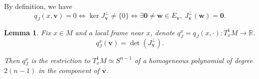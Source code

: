\documentclass[reqno,11pt]{article}
\newtheorem{lemma}{Lemma}[section]
\theoremstyle{definition}
\theoremstyle{remark}
\numberwithin{equation}{section}
\begin{document}
By definition, we have
\begin{displaymath}
	q_{J}(x,\bm{v})=0 \Leftrightarrow\ker J^{\perp}_{\bm{v}}\neq \{0\}\Leftrightarrow \exists \bm{0}\neq\bm{w}\in E_{\bm{v}},~J^{\perp}_{\bm{v}}(\bm{w})=\bm{0}.
\end{displaymath}

\begin{lemma}\label{lem_5_1}
	Fix $x\in M$ and a local frame near $x$, denote $q_{J}^{x}=q_J(x,\cdot):T^{1}_{x}M\to \mathbb{R}$.
	\begin{displaymath}
		q_{J}^{x}(\bm{v})=\det(J_{\bm{v}}^{\perp}).
	\end{displaymath}

	Then $q_{J}^{x}$ is the restriction to $T^{1}_{x}M\simeq S^{n-1}$ of a homogeneous polynomial of degree $2(n-1)$ in the component of $\bm{v}$.
\end{lemma}
\end{document}
